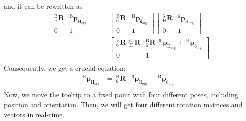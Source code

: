 and it can be rewritten as
\begin{equation}
\begin{split}																												
\begin{bmatrix}
_{\mathrm{H}}^{\mathrm{B}}\mathbf{R} & ^\mathrm{B}\!\boldsymbol{p}_\mathrm{H_{org}}\\ 
0 & 1
\end{bmatrix} &=
\begin{bmatrix}
_{\mathrm{6}}^{\mathrm{B}}\mathbf{R} & ^\mathrm{B}\!\boldsymbol{p}_\mathrm{6_{org}}\\ 
0 & 1
\end{bmatrix}
\begin{bmatrix}
_{\mathrm{H}}^{\mathrm{6}}\mathbf{R} & ^\mathrm{6}\!\boldsymbol{p}_\mathrm{H_{org}}\\ 
0 & 1
\end{bmatrix}\\
&= 
\begin{bmatrix}
_{\mathrm{6}}^{\mathrm{B}}\mathbf{R} \cdot _{\mathrm{H}}^{\mathrm{6}}\!\mathbf{R} & _{\mathrm{6}}^{\mathrm{B}}\mathbf{R} \cdot ^\mathrm{6}\!\!\boldsymbol{p}_\mathrm{H_{org}} +\ ^\mathrm{B}\!\boldsymbol{p}_\mathrm{6_{org}}\\ 
0 & 1
\end{bmatrix}\\
\end{split}
\end{equation}
Consequently, we get a crucial equation:
\begin{equation}
\begin{split}
^\mathrm{B}\!\boldsymbol{p}_\mathrm{H_{org}} &=\  _{\mathrm{6}}^{\mathrm{B}}\mathbf{R}\cdot\ ^\mathrm{6}\!\boldsymbol{p}_\mathrm{H_{org}} +\ ^\mathrm{B}\!\boldsymbol{p}_\mathrm{6_{org}}\\
\end{split}
\end{equation}
Now, we move the tooltip to a fixed point with four different poses, including position and orientation. Then, we will get four different rotation matrices and vectors in real-time. 
